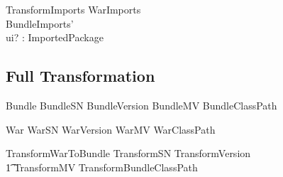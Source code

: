 \documentclass[a4paper,12pt]{article}
\begin{document}
\begin{schema}{TransformImports}
WarImports \\
BundleImports' \\
ui? : \power ImportedPackage \\

\end{schema}

\subsection{Full Transformation}

\begin{zed}
Bundle  BundleSN \land BundleVersion \land BundleMV \land BundleClassPath
\end{zed}

\begin{zed}
War  WarSN \land WarVersion \land WarMV \land WarClassPath
\end{zed}

\begin{zed}
TransformWarToBundle  TransformSN \land TransformVersion \\
\t1 \land TransformMV \land TransformBundleClassPath 
\end{zed}
\end{document}
